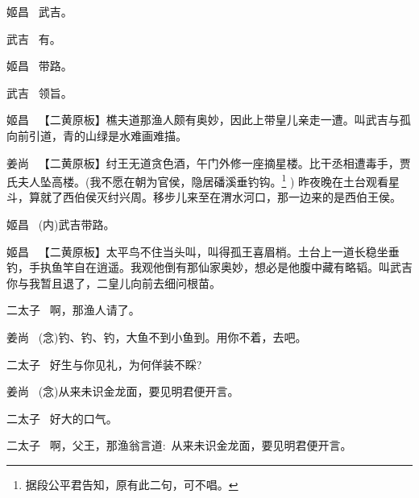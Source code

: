 {姬昌\hspace{30pt}~ 武吉。

武吉\hspace{30pt}~ 有。

姬昌\hspace{30pt}~ 带路。

武吉\hspace{30pt}~ 领旨。

\setlength{\hangindent}{60pt}   %
{姬昌\hspace{30pt}~ 【{\akai 二黄原板}】樵夫道那渔人颇有奥妙，因此上带皇儿亲走一遭。叫武吉与孤向前引道，青的山绿是水难画难描。}

\vspace{5pt}

\setlength{\hangindent}{60pt}   %
{姜尚\hspace{30pt}~ 【{\akai 二黄原板}】纣王无道贪色酒，午门外修一座摘星楼。比干丞相遭毒手，贾氏夫人坠高楼。(我不愿在朝为官侯，隐居磻溪垂钓钩。\footnote{据段公平{\scriptsize 君}告知，原有此二句，可不唱。}%
) 昨夜晚在土台观看星斗，算就了西伯侯灭纣兴周。移步儿来至在渭水河口，那一边来的是西伯王侯。}

姬昌\hspace{30pt}~ ({\akai 内})武吉带路。

\setlength{\hangindent}{60pt}   %
{姬昌\hspace{30pt}~ 【{\akai 二黄原板}】太平鸟不住当头叫，叫得孤王喜眉梢。土台上一道长稳坐垂钓，手执鱼竿自在逍遥。我观他倒有那仙家奥妙，想必是他腹中藏有略韬。叫武吉你与我暂且退了，二皇儿向前去细问根苗。}

{\akai 二}太子\hspace{20pt}~ 啊，那渔人请了。

姜尚\hspace{30pt}~ ({\akai 念})钓、钓、钓，大鱼不到小鱼到。用你不着，去吧。

{\akai 二}太子\hspace{20pt}~ 好生与你见礼，为何佯装不睬?

姜尚\hspace{30pt}~ ({\akai 念})从来未识金龙面，要见明君便开言。

{\akai 二}太子\hspace{20pt}~ 好大的口气。

{\akai 二}太子\hspace{20pt}~ 啊，父王，那渔翁言道:~从来未识金龙面，要见明君便开言。

}
